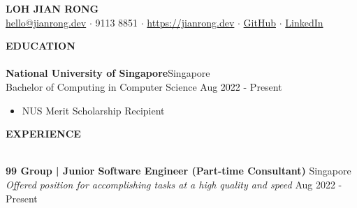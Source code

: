 \documentclass[a4paper]{article}
\newcommand{\lineunder} {
    \vspace*{-8pt} \\
    \hspace*{-12pt} \hrulefill \\
}
\newcommand{\header} [1] {
    {\hspace*{-12pt}\vspace*{6pt} \large\textbf{#1}}
    \vspace*{-6pt} \lineunder
}
\begin{document}
\begin{center}
	{\huge \scshape \textbf{LOH JIAN RONG}}\\
	\href{mailto:hello@jianrong.dev}{hello@jianrong.dev} $\cdot$ 9113 8851 $\cdot$ \href{https://jianrong.dev}{https://jianrong.dev} $\cdot$ \href{https://github.com/jianrong7}{GitHub} $\cdot$ \href{https://www.linkedin.com/in/jianrong7/}{LinkedIn}\\
\end{center}

\header{EDUCATION}
\vspace{1mm}
\textbf{National University of Singapore}\hfill Singapore\\
Bachelor of Computing in Computer Science \hfill Aug 2022 - Present\\
\vspace{-2mm}
\begin{itemize} \itemsep 1pt
	\item NUS Merit Scholarship Recipient
\end{itemize}

\header{EXPERIENCE}
\vspace{1mm}

\textbf{99 Group | Junior Software Engineer (Part-time Consultant)} \hfill Singapore\\
\textit{Offered position for accomplishing tasks at a high quality and speed} \hfill Aug 2022 - Present\\
\vspace{2mm}
\end{document}
